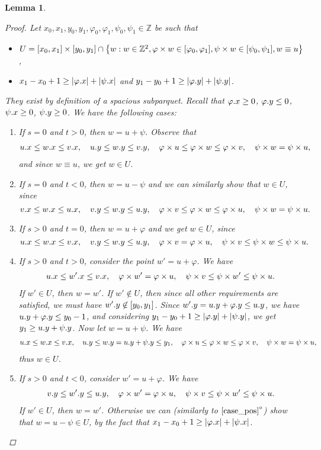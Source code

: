\documentclass[11pt]{article}
\newcommand{\Z}{\mathbb{Z}}
\renewcommand{\phi}{\varphi}
\newcommand{\set}[1]{\left\lbrace #1 \right\rbrace}
\newcommand{\eq}[1]{\begin{align*} #1 \end{align*}}
\theoremstyle{plain}
\newtheorem{lemma}{Lemma}
\theoremstyle{definition}
\theoremstyle{remark}
\begin{document}
\begin{lemma}
\begin{proof}
		Let $x_0, x_1, y_0, y_1, \phi_0, \phi_1, \psi_0, \psi_1 \in \Z$ be such that
		\begin{itemize}
			\item $ U = [x_0, x_1] \times [y_0, y_1] \cap \set{w : w \in \Z^2, \h{w} \in [\phi_0, \phi_1], \s{w} \in [\psi_0, \psi_1], w \equiv u}$,
			\item $x_1 - x_0 + 1 \ge |\x{\phi}| + |\x{\psi}|$ and $y_1 - y_0 + 1 \ge |\y{\phi}| + |\y{\psi}|$.
		\end{itemize}
		They exist by definition of a spacious subparquet.
		Recall that $\x{\phi} \ge 0$, $\y{\phi} \le 0$, $\psi.x \ge 0$, $\psi.y \ge 0$.
		We have the following cases:
		\begin{enumerate}[$1^\circ$]
			\item If $s = 0$ and $t > 0$, then $w = u + \psi$. Observe that
				\eq{
					\x{u} \le \x{w} \le \x{v}, \quad \y{u} \le \y{w} \le \y{v}, \quad \h{u} \le \h{w} \le \h{v}, \quad \s{w} = \s{u},
				}
				and since $w \equiv u$, we get $w \in U$.
			\item If $s = 0$ and $t < 0$, then $w = u - \psi$ and we can similarly show that $w \in U$, since
				$$\x{v} \le \x{w} \le \x{u}, \quad \y{v} \le \y{w} \le \y{u}, \quad \h{v} \le \h{w} \le \h{u}, \quad \s{w} = \s{u}.$$
			\item If $s > 0$ and $t = 0$, then $w = u + \phi$ and we get $w \in U$, since
				$$\x{u} \le \x{w} \le \x{v}, \quad \y{v} \le \y{w} \le \y{u}, \quad \h{v} = \h{u}, \quad \s{v} \le \s{w} \le \s{u}.$$
			\item If $s > 0$ and $t > 0$, consider the point $w' = u + \phi$. \label{case_pos}
				We have \eq{
					\x{u} \le \x{w'} \le \x{v}, \quad \h{w'} = \h{u}, \quad \s{v} \le \s{w'} \le \s{u}.
				}
				If $w' \in U$, then $w = w'$.
				If $w' \not \in U$, then since all other requirements are satisfied, we must have $w'.y \not \in [y_0, y_1]$.
				Since $\y{w'} = \y{u} + \y{\phi} \le \y{u}$, we have $\y{u} + \y{\phi} \le y_0 - 1$, and
				considering $y_1 - y_0 + 1 \ge |\y{\phi}| + |\y{\psi}|$, we get $y_1 \ge u.y + \psi.y$.
				Now let $w = u + \psi$.
				We have \eq{
					\x{u} \le \x{w} \le \x{v}, \quad \y{u} \le \y{w} = \y{u} + \y{\psi} \le y_1, \quad \h{u} \le \h{w} \le \h{v}, \quad \s{w} = \s{u},
				}
				thus $w \in U$.
			\item If $s > 0$ and $t < 0$, consider $w' = u + \phi$.
				We have \eq{
					\y{v} \le \y{w'} \le \y{u}, \quad \h{w'} = \h{u}, \quad \s{v} \le \s{w'} \le \s{u}.
				}
				If $w' \in U$, then $w = w'$.
				Otherwise we can (similarly to $\ref{case_pos}^\circ$) show that $w = u - \psi \in U$, by the fact that $x_1 - x_0 + 1 \ge |\x{\phi}| + |\x{\psi}|$.
		\end{enumerate}
	\end{proof}
\end{lemma}
\end{document}
